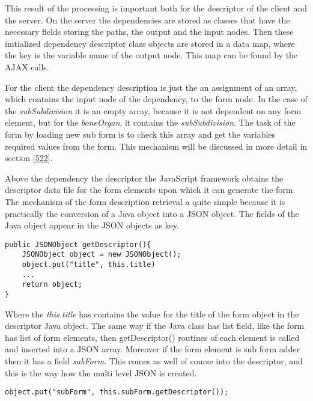 
This result of the processing is important both for the descriptor of the client and the server. On the server the dependencies are stored as classes that have the necessary fields storing the paths, the output and the input nodes. Then these initialized dependency descriptor class objects are stored in a data map, where the key is the variable name of the output node. This map can be found by the AJAX calls. 

For the client the dependency description is just the an assignment of an array, which contains the input node of the dependency, to the form node. In the case of the \textit{subSubdivision} it is an empty array, because it is not dependent on any form element, but for the \textit{boneOrgan}, it contains the \textit{subSubdivision}.  The task of the form by loading new sub form is to check this array and get the variables required values from the form. This mechanism will be discussed in more detail in section \ref{522}. 

Above the dependency the descriptor the JavaScript framework obtains the descriptor data file for the form elements upon which it can generate the form. The mechanism of the form description retrieval a quite simple because it is practically the conversion of a Java object into a JSON object. The fields of the Java object appear in the JSON objects as key. 

\begin{lstlisting}[basicstyle=\footnotesize, frame=single, caption={Java to JSON}, captionpos=b, belowskip=1em, aboveskip=2em]
public JSONObject getDescriptor(){
	JSONObject object = new JSONObject();
	object.put("title", this.title)
	... 
	return object;	
}
\end{lstlisting}

Where the \textit{this.title} has contains the value for the title of the form object in the descriptor Java object. The same way if the Java class has list field, like the form has list of form elements, then getDescriptor() routines of each element is called and inserted into a JSON array. Moreover if the form element is sub form adder then it has a field \textit{subForm}. This comes as well of course into the descriptor, and this is the way how the multi level JSON is created.

\begin{lstlisting}[basicstyle=\footnotesize, frame=single, caption={Subform descriptor}, captionpos=b, belowskip=1em, aboveskip=2em]
	object.put("subForm", this.subForm.getDescriptor());
\end{lstlisting}

